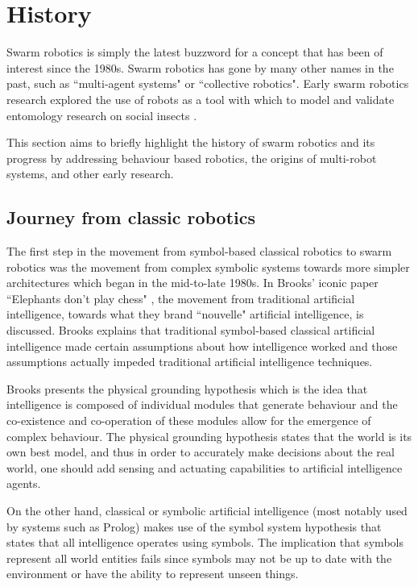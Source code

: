 \section{History}
\label{history}
 
Swarm robotics is simply the latest buzzword for a concept that has been of interest since the 1980s. Swarm robotics has gone by many other names in the past, such as ``multi-agent systems" or ``collective robotics". Early swarm robotics research explored the use of robots as a tool with which to model and validate entomology research on social insects \cite{dorigo2014swarm, beni1993swarm, seeley2009wisdom}.

This section aims to briefly highlight the history of swarm robotics and its progress by addressing behaviour based robotics, the origins of multi-robot systems, and other early research.

\subsection{Journey from classic robotics}
\label{journeyfromtraditionalAI}

The first step in the movement from symbol-based classical robotics to swarm robotics was the movement from complex symbolic systems towards more simpler architectures which began in the mid-to-late 1980s. In Brooks' iconic paper ``Elephants don't play chess" \cite{brooks1990elephants}, the movement from traditional artificial intelligence, towards what they brand ``nouvelle" artificial intelligence, is discussed. Brooks explains that traditional symbol-based classical artificial intelligence made certain assumptions about how intelligence worked and those assumptions actually impeded traditional artificial intelligence techniques. 

Brooks presents the physical grounding hypothesis which is the idea that intelligence is composed of individual modules that generate behaviour and the co-existence and co-operation of these modules allow for the emergence of complex behaviour. The physical grounding hypothesis states that the world is its own best model, and thus in order to accurately make decisions about the real world, one should add sensing and actuating capabilities to artificial intelligence agents.

On the other hand, classical or symbolic artificial intelligence (most notably used by systems such as Prolog) makes use of the symbol system hypothesis that states that all intelligence operates using symbols. The implication that symbols represent all world entities fails since symbols may not be up to date with the environment or have the ability to represent unseen things. 


